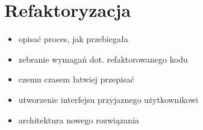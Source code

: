 \section{Refaktoryzacja}

\begin{itemize}
\item opisać proces, jak przebiegała
\item zebranie wymagań dot. refaktorowanego kodu
\item czemu czasem łatwiej przepisać
\item utworzenie interfejsu przyjaznego użytkownikowi
\item architektura nowego rozwiązania
\end{itemize}